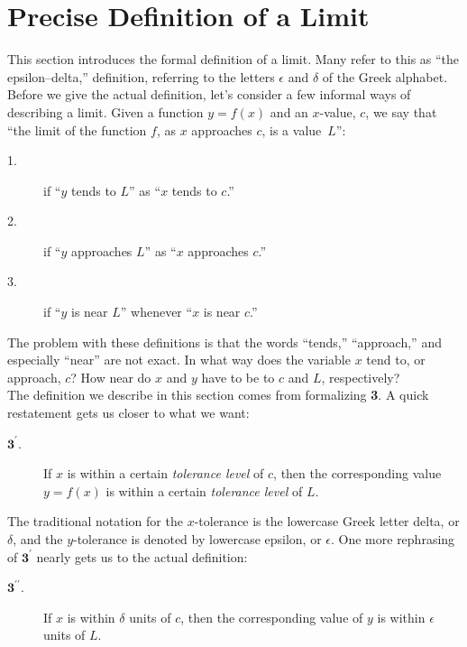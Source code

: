 \section{Precise Definition of a Limit}\label{sec:LimitsFormal}


This section introduces the formal definition of a limit. Many refer to this as ``the epsilon--delta,'' definition, referring to the letters $\epsilon$ and $\delta$ of the Greek alphabet.\\

Before we give the actual definition, let's consider a few informal ways of describing a limit.  Given a function $y=f(x)$ and an $x$-value, $c$, we say that ``the limit of the function $f$, as $x$ approaches $c$, is a value~$L$'': 

\begin{description}
\item[1.]if ``$y$ tends to $L$'' as ``$x$ tends to $c$.''
\item[2.]if ``$y$ approaches $L$'' as ``$x$ approaches $c$.''
\item[3.]if ``$y$ is near $L$'' whenever ``$x$ is near $c$.''
\end{description}

The problem with these definitions is that the words ``tends,'' ``approach,'' and especially ``near'' are not exact.  In what way does the variable $x$ tend to, or approach, $c$? How near do $x$ and $y$ have to be to $c$ and $L$, respectively?  \\

The definition we describe in this section comes from formalizing {\bf 3}.  A quick restatement gets us closer to what we want:

\begin{description}
\item[$\textbf{3}^\prime$.]If $x$ is within a certain \textit{tolerance level} of $c$, then the corresponding value $y=f(x)$ is within a certain \textit{tolerance level} of $L$.
\end{description}

The traditional notation for the $x$-tolerance is the lowercase Greek letter delta, or $\delta$, and the $y$-tolerance is denoted by lowercase epsilon, or $\epsilon$. One more rephrasing of $\textbf{3}^\prime$ nearly gets us to the actual definition:

\begin{description}
\item[$\textbf{3}^{\prime \prime}$.]If $x$ is within $\delta$ units of $c$, then the corresponding value of $y$ is within $\epsilon$ units of $L$.
\end{description}

